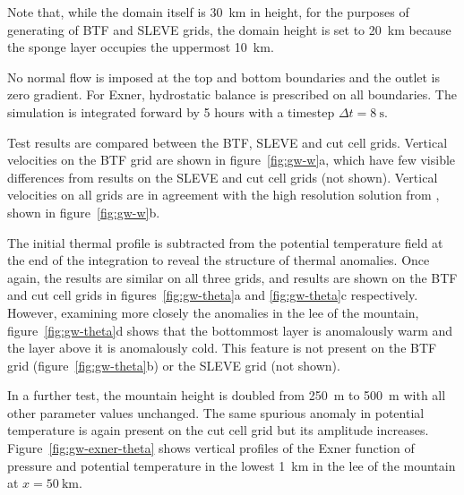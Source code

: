 \documentclass[twocol]{ametsoc}
\begin{document}
Note that, while the domain itself is \SI{30}{\kilo\meter} in height, for the purposes of generating of BTF and SLEVE grids, the domain height is set to \SI{20}{\kilo\meter} because the sponge layer occupies the uppermost \SI{10}{\kilo\meter}.

No normal flow is imposed at the top and bottom boundaries and the outlet is zero gradient.  For Exner, hydrostatic balance is prescribed on all boundaries.  The simulation is integrated forward by 5 hours with a timestep $\Delta t = \SI{8}{\second}$.

Test results are compared between the BTF, SLEVE and cut cell grids.  Vertical velocities on the BTF grid are shown in figure~\ref{fig:gw-w}a, which have few visible differences from results on the SLEVE and cut cell grids (not shown).  Vertical velocities on all grids are in agreement with the high resolution solution from \citet{melvin2010}, shown in figure~\ref{fig:gw-w}b.

The initial thermal profile is subtracted from the potential temperature field at the end of the integration to reveal the structure of thermal anomalies.  Once again, the results are similar on all three grids, and results are shown on the BTF and cut cell grids in figures~\ref{fig:gw-theta}a and \ref{fig:gw-theta}c respectively.  However, examining more closely the anomalies in the lee of the mountain, figure~\ref{fig:gw-theta}d shows that the bottommost layer is anomalously warm and the layer above it is anomalously cold.  This feature is not present on the BTF grid (figure~\ref{fig:gw-theta}b) or the SLEVE grid (not shown).  

In a further test, the mountain height is doubled from \SI{250}{\meter} to \SI{500}{\meter} with all other parameter values unchanged.  The same spurious anomaly in potential temperature is again present on the cut cell grid but its amplitude increases.  Figure~\ref{fig:gw-exner-theta} shows vertical profiles of the Exner function of pressure and potential temperature in the lowest \SI{1}{\kilo\meter} in the lee of the mountain at \(x = \SI{50}{\kilo\meter}\).  
\end{document}
